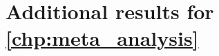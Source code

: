 





\clearpage

    

\section[\autoref{chp:meta_analysis}]{Additional results for \autoref{chp:meta_analysis}}


